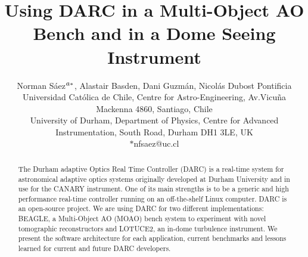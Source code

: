 \documentclass[]{spie}  %
\title{Using DARC in a Multi-Object AO Bench and in a Dome Seeing Instrument}
\author{Norman S\'aez$\supit{a}^{*}$, Alastair Basden\supit{b}, Dani Guzm\'an\supit{a}, Nicol\'as Dubost\supit{a}
\skiplinehalf
\supit{a}Pontificia Universidad Cat\'olica de Chile, Centre for Astro-Engineering, Av.Vicu\~na Mackenna 4860, Santiago, Chile\\
\supit{b}University of Durham, Department of Physics, Centre for Advanced Instrumentation, South Road, Durham DH1 3LE, UK\\ $*$nfsaez@uc.cl
}
\begin{document}
 
  \maketitle 

\begin{abstract}
The Durham adaptive Optics Real Time Controller (DARC)\cite{basden2010durham}
is a real-time system for astronomical adaptive optics systems originally
developed at Durham University and in use for the CANARY instrument. One of its
main strengths is to be a generic and high performance real-time controller
running on an off-the-shelf Linux computer. DARC is an open-source project. We
are using DARC for two different implementations: BEAGLE, a Multi-Object AO
(MOAO) bench system to experiment with novel tomographic reconstructors and
LOTUCE2, an in-dome turbulence instrument. We present the software architecture
for each application, current benchmarks and lessons learned for current and
future DARC developers.
\end{abstract}



\end{document}
